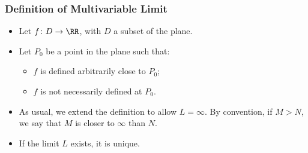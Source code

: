 \begin{frame}
\frametitle{Definition of Multivariable Limit}
\begin{itemize}
\item Let $f\colon D \to \RR$, with $D$ a subset of the plane.
\item Let $P_0$ be a point in the plane such that:
\begin{itemize}
\item $f$ is defined arbitrarily close to $P_0$;
\item $f$ is not necessarily defined at $P_0$.
\end{itemize}
\item<4-> As usual, we extend the definition to allow $L=\infty$. By convention, if $M>N$, we say that $M$ is closer to $\infty$ than $N$.
\item<5-> If the limit $L$ exists, it is unique.
\end{itemize}
\end{frame}
